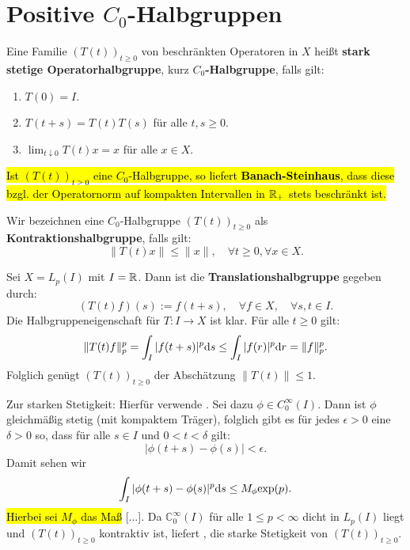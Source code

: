 \section{Positive $C_0$-Halbgruppen}

\begin{defi}
Eine Familie $(T(t))_{t\geq0}$ von beschränkten Operatoren in $X$  heißt \textbf{stark stetige Operatorhalbgruppe}, kurz \textbf{$C_0$-Halbgruppe}, falls gilt:
\begin{enumerate}
\item $T(0)=I$.
\item $T(t+s)=T(t)T(s)$ für alle $t,s\geq0$.
\item $\lim_{t\downarrow 0}T(t)x=x$ für alle $x\in X$.
\end{enumerate}
\end{defi}

\begin{bem}
\hl{Ist $(T(t))_{t\geq0}$ eine $C_0$-Halbgruppe, so liefert \textbf{Banach-Steinhaus}, dass diese bzgl. der Operatornorm auf kompakten Intervallen in $\mathbb{R}_+$ stets beschränkt ist.}
\end{bem}

\begin{defi}
Wir bezeichnen eine $C_0$-Halbgruppe $(T(t))_{t\geq0}$ als \textbf{Kontraktionshalbgruppe}, falls gilt:
\begin{equation*}
\|T(t)x\|\leq\|x\|,\quad\forall t\geq0, \forall x\in X.
\end{equation*}
\end{defi}

\begin{bsp}
Sei $X=L_p(I)$ mit $I=\mathbb{R}$. Dann ist die \textbf{Translationshalbgruppe} gegeben durch:
\begin{equation*}
(T(t)f)(s):=f(t+s),\quad \forall f\in X,\quad \forall s,t\in I.
\end{equation*}
Die Halbgruppeneigenschaft für $T\colon I\to X$ ist klar. Für alle $t\geq0$ gilt:
\begin{equation*}
\|T(t)f\|_p^p=\int_I|f(t+s)|^p\text ds\leq\int_I|f(r)|^p \text dr =\|f\|_p^p.
\end{equation*}
Folglich genügt $(T(t))_{t\geq0}$ der Abschätzung $\|T(t)\|\leq 1$.

\par
Zur starken Stetigkeit: Hierfür verwende \Cref{}. Sei dazu $\phi\in C_0^\infty(I)$. Dann ist $\phi$ gleichmäßig stetig (mit kompaktem Träger), folglich gibt es für jedes $\epsilon>0$ eine $\delta>0$ so, dass für alle $s\in I$ und $0<t<\delta$ gilt:
\begin{equation*}
|\phi(t+s)-\phi(s)|<\epsilon.
\end{equation*}
Damit sehen wir
\begin{equation*}
\int_I|\phi(t+s)-\phi(s)|^p\text ds\leq M_\phi \text{exp}(p).
\end{equation*}
\hl{Hierbei sei $M_\phi$ das Maß} [...]. Da $\mathbb C_0^\infty(I)$ für alle $1\leq p<\infty$ dicht in $L_p(I)$ liegt und $(T(t))_{t\geq0}$ kontraktiv ist, liefert \Cref{}, die starke Stetigkeit von $(T(t))_{t\geq0}$.
\end{bsp}

